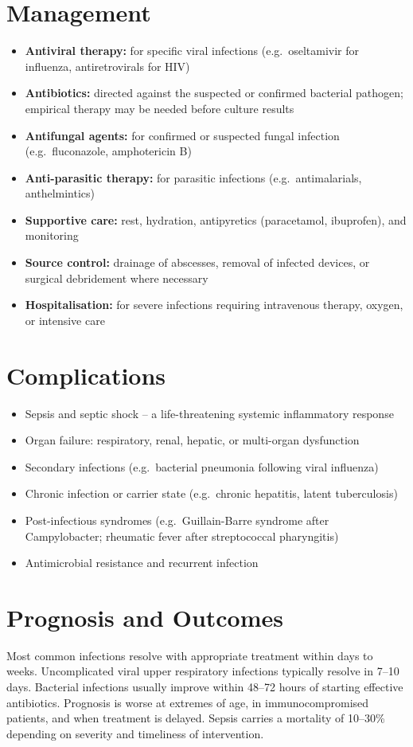 \section*{Management}
\begin{itemize}
    \item \textbf{Antiviral therapy:} for specific viral infections (e.g.\ oseltamivir for influenza, antiretrovirals for HIV)
    \item \textbf{Antibiotics:} directed against the suspected or confirmed bacterial pathogen; empirical therapy may be needed before culture results
    \item \textbf{Antifungal agents:} for confirmed or suspected fungal infection (e.g.\ fluconazole, amphotericin B)
    \item \textbf{Anti-parasitic therapy:} for parasitic infections (e.g.\ antimalarials, anthelmintics)
    \item \textbf{Supportive care:} rest, hydration, antipyretics (paracetamol, ibuprofen), and monitoring
    \item \textbf{Source control:} drainage of abscesses, removal of infected devices, or surgical debridement where necessary
    \item \textbf{Hospitalisation:} for severe infections requiring intravenous therapy, oxygen, or intensive care
\end{itemize}

\section*{Complications}
\begin{itemize}
    \item Sepsis and septic shock -- a life-threatening systemic inflammatory response
    \item Organ failure: respiratory, renal, hepatic, or multi-organ dysfunction
    \item Secondary infections (e.g.\ bacterial pneumonia following viral influenza)
    \item Chronic infection or carrier state (e.g.\ chronic hepatitis, latent tuberculosis)
    \item Post-infectious syndromes (e.g.\ Guillain-Barre syndrome after Campylobacter; rheumatic fever after streptococcal pharyngitis)
    \item Antimicrobial resistance and recurrent infection
\end{itemize}

\section*{Prognosis and Outcomes}
Most common infections resolve with appropriate treatment within days to weeks. Uncomplicated viral upper respiratory infections typically resolve in 7--10 days. Bacterial infections usually improve within 48--72 hours of starting effective antibiotics. Prognosis is worse at extremes of age, in immunocompromised patients, and when treatment is delayed. Sepsis carries a mortality of 10--30\% depending on severity and timeliness of intervention.

